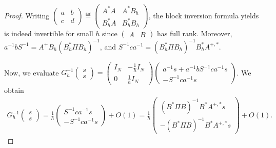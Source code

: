 \begin{proof}
Writing  $\begin{pmatrix} a & b\\ c & d\end{pmatrix}\eqdef\begin{pmatrix} A^*A & A^*B_h\\B_h^*A & B_h^*B_h\end{pmatrix}$, the block inversion formula yields
is indeed invertible for small $h$ since $\begin{pmatrix} A & B \end{pmatrix}$ has full rank. Moreover, $a^{-1}bS^{-1}= A^+B_h(B_h^*\Pi B_h)^{-1}$, and $S^{-1}ca^{-1}= (B_h^*\Pi B_h)^{-1}B_h^*A^{+,*}$.

Now, we evaluate $G_h^{-1}\begin{pmatrix} s\\s\end{pmatrix}=\begin{pmatrix}I_N & -\frac{1}{h}I_N\\0 & \frac{1}{h}I_N\end{pmatrix}
 \begin{pmatrix}
   a^{-1}s +  a^{-1}bS^{-1}ca^{-1}s\\
  -S^{-1}ca^{-1}s 
 \end{pmatrix}$. We obtain 
 \begin{align*}G_h^{-1}\begin{pmatrix} s\\s\end{pmatrix}= \frac{1}{h}  \begin{pmatrix}
   S^{-1}ca^{-1}s \\-S^{-1}ca^{-1}s 
 \end{pmatrix}+O(1) = \frac{1}{h} \begin{pmatrix} (B^*\Pi B)^{-1}B^*A^{+,*}s\\-(B^*\Pi B)^{-1}B^*A^{+,*}s \end{pmatrix}+O(1).
 \end{align*}


\end{proof}
